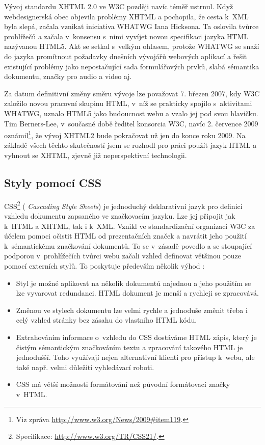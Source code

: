 Vývoj standardu XHTML 2.0 ve W3C později navíc téměř ustrnul. Když
webdesignerská obec objevila problémy XHTML a pochopila, že cesta
k~XML byla slepá, začala vznikat iniciativa WHATWG Iana
Hicksona. Ta oslovila tvůrce prohlížečů a začala v~konsensu s~nimi
vyvíjet novou specifikaci jazyka HTML nazývanou HTML5. Akt se setkal
s~velkým ohlasem, protože WHATWG se snaží do jazyka promítnout
požadavky dnešních vývojářů webových aplikací a řešit existující
problémy jako nepostačující sada formulářových prvků, slabá sémantika
dokumentu, značky pro audio a video aj. \cite{whatwg}

Za datum definitivní změny směru vývoje lze považovat 7. březen 2007,
kdy W3C založilo novou pracovní skupinu HTML, v~níž se prakticky spojilo
s~aktivitami WHATWG, uznalo HTML5 jako budoucnost webu a vzalo
jej pod svou hlavičku. Tim Berners-Lee, v~současné době ředitel
konsorcia W3C, navíc 2. července 2009 oznámil\footnote{Viz zpráva
\url{http://www.w3.org/News/2009\#item119}.}, že vývoj XHTML2 bude
pokračovat už jen do konce roku 2009. Na základě všech těchto
skutečností jsem se rozhodl pro práci použít jazyk HTML a vyhnout se
XHTML, zjevně již neperspektivní technologii.

\subsection{Styly pomocí CSS}\label{css}
CSS\footnote{Specifikace: \url{http://www.w3.org/TR/CSS21/}.} ({\it
Cascading Style Sheets}) je jednoduchý deklarativní jazyk pro definici vzhledu
dokumentu zapsaného ve značkovacím jazyku. Lze
jej připojit jak k~HTML a XHTML, tak i k~XML. Vznikl ve
standardizační organizaci W3C za účelem pomoci očistit HTML od
prezentačních značek a navrátit jeho použití k~sémantickému
značkování dokumentů. To se v~zásadě povedlo a se stoupající podporou
v~prohlížečích tvůrci webu začali vzhled definovat většinou pouze
pomocí externích stylů. To poskytuje především několik výhod
\cite{css1}:

\begin{itemize}
	\item Styl je možné aplikovat na několik dokumentů najednou a jeho
	použitím se lze vyvarovat redundanci. HTML dokument je menší a
	rychleji se zpracovává.
	\item Změnou ve stylech dokumentu lze velmi rychle a jednoduše
	změnit třeba i celý vzhled stránky bez zásahu do vlastního HTML
	kódu.
	\item Extrahováním informace o~vzhledu do CSS dostáváme HTML zápis,
	který je čistým sémantickým značkováním textu a zpracování takového
	HTML je jednodušší. Toho využívají nejen alternativní klienti pro
	přístup k~webu, ale také např. velmi důležití vyhledávací roboti.
	\item CSS má větší možnosti formátování než původní formátovací
	značky v~HTML.
\end{itemize}

